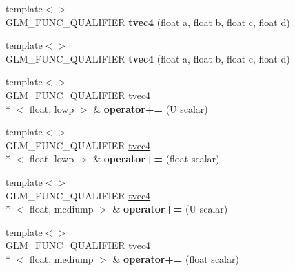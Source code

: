 \begin{DoxyCompactItemize}
\item 
\hypertarget{structglm_1_1tvec4_a57c013be906b4fbadcef0fa2c682c9e8}{{\footnotesize template$<$$>$ }\\G\-L\-M\-\_\-\-F\-U\-N\-C\-\_\-\-Q\-U\-A\-L\-I\-F\-I\-E\-R {\bfseries tvec4} (float a, float b, float c, float d)}\label{structglm_1_1tvec4_a57c013be906b4fbadcef0fa2c682c9e8}

\item 
\hypertarget{structglm_1_1tvec4_a2fc076a63691588c10382548cfa718c9}{{\footnotesize template$<$$>$ }\\G\-L\-M\-\_\-\-F\-U\-N\-C\-\_\-\-Q\-U\-A\-L\-I\-F\-I\-E\-R {\bfseries tvec4} (float a, float b, float c, float d)}\label{structglm_1_1tvec4_a2fc076a63691588c10382548cfa718c9}

\item 
\hypertarget{structglm_1_1tvec4_a8df8c5f58ac20152d17e6cf7185b6449}{{\footnotesize template$<$$>$ }\\G\-L\-M\-\_\-\-F\-U\-N\-C\-\_\-\-Q\-U\-A\-L\-I\-F\-I\-E\-R \hyperlink{structglm_1_1tvec4}{tvec4}\\*
$<$ float, lowp $>$ \& {\bfseries operator+=} (U scalar)}\label{structglm_1_1tvec4_a8df8c5f58ac20152d17e6cf7185b6449}

\item 
\hypertarget{structglm_1_1tvec4_ab4617e2a74f3502c88e6484209b0881a}{{\footnotesize template$<$$>$ }\\G\-L\-M\-\_\-\-F\-U\-N\-C\-\_\-\-Q\-U\-A\-L\-I\-F\-I\-E\-R \hyperlink{structglm_1_1tvec4}{tvec4}\\*
$<$ float, lowp $>$ \& {\bfseries operator+=} (float scalar)}\label{structglm_1_1tvec4_ab4617e2a74f3502c88e6484209b0881a}

\item 
\hypertarget{structglm_1_1tvec4_a6d2780001d97b7fc2a4dfaaa741fc04b}{{\footnotesize template$<$$>$ }\\G\-L\-M\-\_\-\-F\-U\-N\-C\-\_\-\-Q\-U\-A\-L\-I\-F\-I\-E\-R \hyperlink{structglm_1_1tvec4}{tvec4}\\*
$<$ float, mediump $>$ \& {\bfseries operator+=} (U scalar)}\label{structglm_1_1tvec4_a6d2780001d97b7fc2a4dfaaa741fc04b}

\item 
\hypertarget{structglm_1_1tvec4_ac32c73f3c4e09aaa47df7819dddccbb7}{{\footnotesize template$<$$>$ }\\G\-L\-M\-\_\-\-F\-U\-N\-C\-\_\-\-Q\-U\-A\-L\-I\-F\-I\-E\-R \hyperlink{structglm_1_1tvec4}{tvec4}\\*
$<$ float, mediump $>$ \& {\bfseries operator+=} (float scalar)}\label{structglm_1_1tvec4_ac32c73f3c4e09aaa47df7819dddccbb7}


\end{DoxyCompactItemize}

